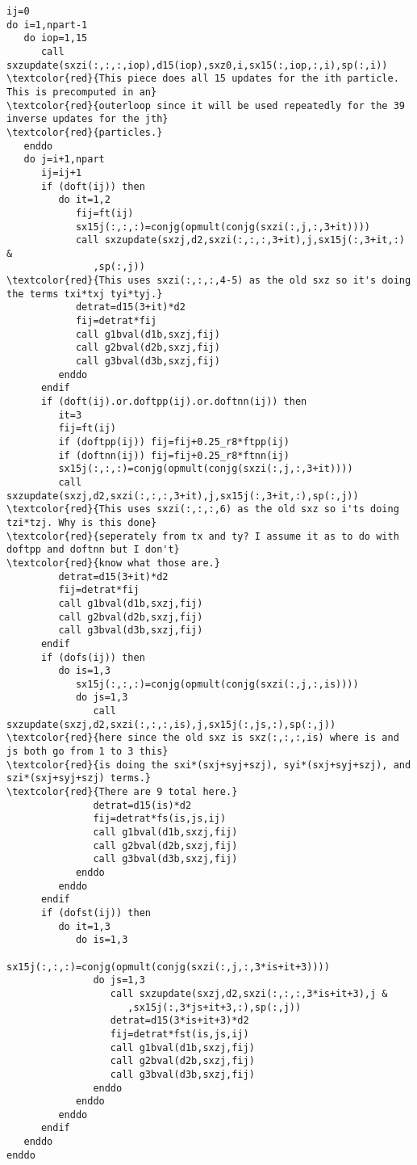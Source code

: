 \documentclass[12pt]{extarticle}
\begin{document}
\begin{Verbatim}[commandchars=\\\{\}]
ij=0
do i=1,npart-1
   do iop=1,15
      call sxzupdate(sxzi(:,:,:,iop),d15(iop),sxz0,i,sx15(:,iop,:,i),sp(:,i))
\textcolor{red}{This piece does all 15 updates for the ith particle. This is precomputed in an}
\textcolor{red}{outerloop since it will be used repeatedly for the 39 inverse updates for the jth}
\textcolor{red}{particles.}
   enddo
   do j=i+1,npart
      ij=ij+1
      if (doft(ij)) then
         do it=1,2
            fij=ft(ij)
            sx15j(:,:,:)=conjg(opmult(conjg(sxzi(:,j,:,3+it))))
            call sxzupdate(sxzj,d2,sxzi(:,:,:,3+it),j,sx15j(:,3+it,:) &
               ,sp(:,j))
\textcolor{red}{This uses sxzi(:,:,:,4-5) as the old sxz so it's doing the terms txi*txj tyi*tyj.}
            detrat=d15(3+it)*d2
            fij=detrat*fij
            call g1bval(d1b,sxzj,fij)
            call g2bval(d2b,sxzj,fij)
            call g3bval(d3b,sxzj,fij)
         enddo
      endif
      if (doft(ij).or.doftpp(ij).or.doftnn(ij)) then
         it=3
         fij=ft(ij)
         if (doftpp(ij)) fij=fij+0.25_r8*ftpp(ij)
         if (doftnn(ij)) fij=fij+0.25_r8*ftnn(ij)
         sx15j(:,:,:)=conjg(opmult(conjg(sxzi(:,j,:,3+it))))
         call sxzupdate(sxzj,d2,sxzi(:,:,:,3+it),j,sx15j(:,3+it,:),sp(:,j))
\textcolor{red}{This uses sxzi(:,:,:,6) as the old sxz so i'ts doing tzi*tzj. Why is this done}
\textcolor{red}{seperately from tx and ty? I assume it as to do with doftpp and doftnn but I don't}
\textcolor{red}{know what those are.}
         detrat=d15(3+it)*d2
         fij=detrat*fij
         call g1bval(d1b,sxzj,fij)
         call g2bval(d2b,sxzj,fij)
         call g3bval(d3b,sxzj,fij)
      endif
      if (dofs(ij)) then
         do is=1,3
            sx15j(:,:,:)=conjg(opmult(conjg(sxzi(:,j,:,is))))
            do js=1,3
               call sxzupdate(sxzj,d2,sxzi(:,:,:,is),j,sx15j(:,js,:),sp(:,j))
\textcolor{red}{here since the old sxz is sxz(:,:,:,is) where is and js both go from 1 to 3 this}
\textcolor{red}{is doing the sxi*(sxj+syj+szj), syi*(sxj+syj+szj), and szi*(sxj+syj+szj) terms.}
\textcolor{red}{There are 9 total here.}
               detrat=d15(is)*d2
               fij=detrat*fs(is,js,ij)
               call g1bval(d1b,sxzj,fij)
               call g2bval(d2b,sxzj,fij)
               call g3bval(d3b,sxzj,fij)
            enddo
         enddo
      endif
      if (dofst(ij)) then
         do it=1,3
            do is=1,3
               sx15j(:,:,:)=conjg(opmult(conjg(sxzi(:,j,:,3*is+it+3))))
               do js=1,3
                  call sxzupdate(sxzj,d2,sxzi(:,:,:,3*is+it+3),j &
                     ,sx15j(:,3*js+it+3,:),sp(:,j))
                  detrat=d15(3*is+it+3)*d2
                  fij=detrat*fst(is,js,ij)
                  call g1bval(d1b,sxzj,fij)
                  call g2bval(d2b,sxzj,fij)
                  call g3bval(d3b,sxzj,fij)
               enddo
            enddo
         enddo
      endif
   enddo
enddo
\end{Verbatim}
\end{document}
